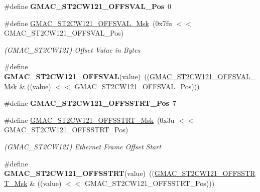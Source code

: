 \begin{DoxyCompactItemize}
\item 
\mbox{\label{group__SAME70__GMAC_ga9a3ea493e0fbaff8801e9671660c8839}} 
\#define {\bfseries G\+M\+A\+C\+\_\+\+S\+T2\+C\+W121\+\_\+\+O\+F\+F\+S\+V\+A\+L\+\_\+\+Pos}~0
\item 
\mbox{\label{group__SAME70__GMAC_ga4b0c43166701b639b13c0328b73bbf34}} 
\#define \mbox{\hyperlink{group__SAME70__GMAC_ga4b0c43166701b639b13c0328b73bbf34}{G\+M\+A\+C\+\_\+\+S\+T2\+C\+W121\+\_\+\+O\+F\+F\+S\+V\+A\+L\+\_\+\+Msk}}~(0x7fu $<$$<$ G\+M\+A\+C\+\_\+\+S\+T2\+C\+W121\+\_\+\+O\+F\+F\+S\+V\+A\+L\+\_\+\+Pos)
\begin{DoxyCompactList}\small\item\em (G\+M\+A\+C\+\_\+\+S\+T2\+C\+W121) Offset Value in Bytes \end{DoxyCompactList}\item 
\mbox{\label{group__SAME70__GMAC_ga79cfaf80f43546a84dcd8949f65054c8}} 
\#define {\bfseries G\+M\+A\+C\+\_\+\+S\+T2\+C\+W121\+\_\+\+O\+F\+F\+S\+V\+AL}(value)~((\mbox{\hyperlink{group__SAMV71__GMAC_ga4b0c43166701b639b13c0328b73bbf34}{G\+M\+A\+C\+\_\+\+S\+T2\+C\+W121\+\_\+\+O\+F\+F\+S\+V\+A\+L\+\_\+\+Msk}} \& ((value) $<$$<$ G\+M\+A\+C\+\_\+\+S\+T2\+C\+W121\+\_\+\+O\+F\+F\+S\+V\+A\+L\+\_\+\+Pos)))
\item 
\mbox{\label{group__SAME70__GMAC_ga7c1c62749e31d5d1f778f89cc8274fb1}} 
\#define {\bfseries G\+M\+A\+C\+\_\+\+S\+T2\+C\+W121\+\_\+\+O\+F\+F\+S\+S\+T\+R\+T\+\_\+\+Pos}~7
\item 
\mbox{\label{group__SAME70__GMAC_gaa5d9cfd6547ca84e3e577263e197b4a6}} 
\#define \mbox{\hyperlink{group__SAME70__GMAC_gaa5d9cfd6547ca84e3e577263e197b4a6}{G\+M\+A\+C\+\_\+\+S\+T2\+C\+W121\+\_\+\+O\+F\+F\+S\+S\+T\+R\+T\+\_\+\+Msk}}~(0x3u $<$$<$ G\+M\+A\+C\+\_\+\+S\+T2\+C\+W121\+\_\+\+O\+F\+F\+S\+S\+T\+R\+T\+\_\+\+Pos)
\begin{DoxyCompactList}\small\item\em (G\+M\+A\+C\+\_\+\+S\+T2\+C\+W121) Ethernet Frame Offset Start \end{DoxyCompactList}\item 
\mbox{\label{group__SAME70__GMAC_gaf836e267187115fcfe20a4086ddf07aa}} 
\#define {\bfseries G\+M\+A\+C\+\_\+\+S\+T2\+C\+W121\+\_\+\+O\+F\+F\+S\+S\+T\+RT}(value)~((\mbox{\hyperlink{group__SAMV71__GMAC_gaa5d9cfd6547ca84e3e577263e197b4a6}{G\+M\+A\+C\+\_\+\+S\+T2\+C\+W121\+\_\+\+O\+F\+F\+S\+S\+T\+R\+T\+\_\+\+Msk}} \& ((value) $<$$<$ G\+M\+A\+C\+\_\+\+S\+T2\+C\+W121\+\_\+\+O\+F\+F\+S\+S\+T\+R\+T\+\_\+\+Pos)))

\end{DoxyCompactItemize}
